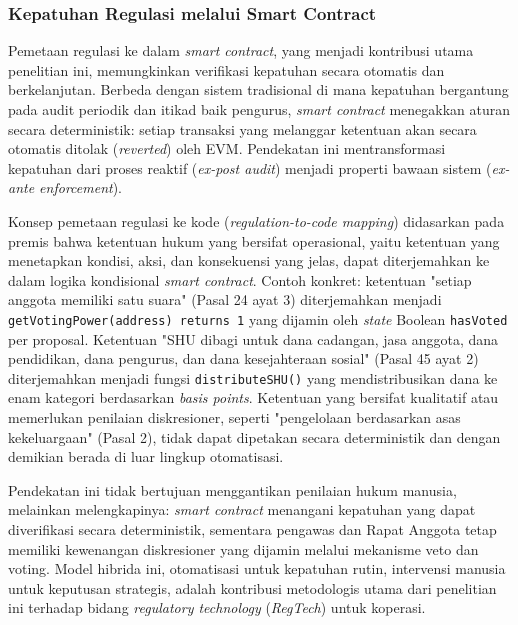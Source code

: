 \subsubsection{Kepatuhan Regulasi melalui Smart Contract}

Pemetaan regulasi ke dalam \textit{smart contract}, yang menjadi kontribusi utama penelitian ini, memungkinkan verifikasi kepatuhan secara otomatis dan berkelanjutan. Berbeda dengan sistem tradisional di mana kepatuhan bergantung pada audit periodik dan itikad baik pengurus, \textit{smart contract} menegakkan aturan secara deterministik: setiap transaksi yang melanggar ketentuan akan secara otomatis ditolak (\textit{reverted}) oleh EVM. Pendekatan ini mentransformasi kepatuhan dari proses reaktif (\textit{ex-post audit}) menjadi properti bawaan sistem (\textit{ex-ante enforcement}).

Konsep pemetaan regulasi ke kode (\textit{regulation-to-code mapping}) didasarkan pada premis bahwa ketentuan hukum yang bersifat operasional, yaitu ketentuan yang menetapkan kondisi, aksi, dan konsekuensi yang jelas, dapat diterjemahkan ke dalam logika kondisional \textit{smart contract}. Contoh konkret: ketentuan "setiap anggota memiliki satu suara" (Pasal 24 ayat 3) diterjemahkan menjadi \texttt{getVotingPower(address) returns 1} yang dijamin oleh \textit{state} Boolean \texttt{hasVoted} per proposal. Ketentuan "SHU dibagi untuk dana cadangan, jasa anggota, dana pendidikan, dana pengurus, dan dana kesejahteraan sosial" (Pasal 45 ayat 2) diterjemahkan menjadi fungsi \texttt{distributeSHU()} yang mendistribusikan dana ke enam kategori berdasarkan \textit{basis points}. Ketentuan yang bersifat kualitatif atau memerlukan penilaian diskresioner, seperti "pengelolaan berdasarkan asas kekeluargaan" (Pasal 2), tidak dapat dipetakan secara deterministik dan dengan demikian berada di luar lingkup otomatisasi.

Pendekatan ini tidak bertujuan menggantikan penilaian hukum manusia, melainkan melengkapinya: \textit{smart contract} menangani kepatuhan yang dapat diverifikasi secara deterministik, sementara pengawas dan Rapat Anggota tetap memiliki kewenangan diskresioner yang dijamin melalui mekanisme veto dan voting. Model hibrida ini, otomatisasi untuk kepatuhan rutin, intervensi manusia untuk keputusan strategis, adalah kontribusi metodologis utama dari penelitian ini terhadap bidang \textit{regulatory technology} (\textit{RegTech}) untuk koperasi.

